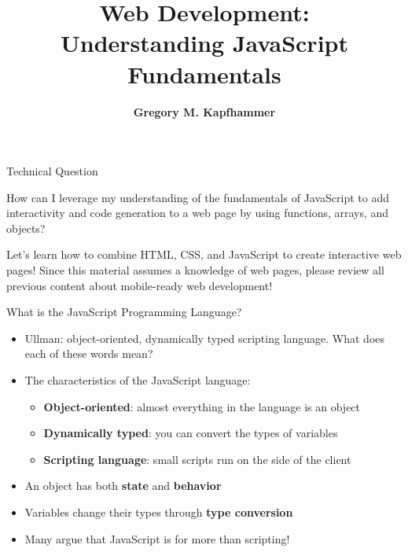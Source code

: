 \documentclass[14pt,aspectratio=169]{beamer}
\title{Web Development: \\ Understanding JavaScript Fundamentals}
\author{{\bf Gregory M. Kapfhammer}}
\institute[shortinst]{{\bf Department of Computer Science, Allegheny College}}
\begin{document}
{
  \begin{frame}
    \titlepage
  \end{frame}
}

%
\begin{frame}{Technical Question}
  \hspace*{.25in}
  \begin{minipage}{4.75in}
    \vspace*{.2in}
    \begin{center}
      {\large How can I leverage my understanding of the fundamentals of
        JavaScript to add interactivity and code generation to a web page by
      using functions, arrays, and objects?}
    \end{center}
  \end{minipage}
  \vspace{3ex}
  \begin{center}
    \small Let's learn how to combine HTML, CSS, and JavaScript to create
    interactive web pages! Since this material assumes a knowledge of web
    pages, please review all previous content about mobile-ready web
    development! \\
  \end{center}
\end{frame}

%
\begin{frame}{What is the JavaScript Programming Language?}
  \begin{itemize}
    \item Ullman: object-oriented, dynamically typed scripting language. What
      does each of these words mean?
      \vspace*{-.15in}
    \item The characteristics of the JavaScript language:
      \begin{itemize}
        \item {\bf Object-oriented}: almost everything in the language is an
          object
        \item {\bf Dynamically typed}: you can convert the types of variables
        \item {\bf Scripting language}: small scripts run on the side of the client
      \end{itemize}
      \vspace*{-.2in}
    \item An object has both {\bf state} and {\bf behavior}
      \vspace*{-.2in}
    \item Variables change their types through {\bf type conversion}
      \vspace*{-.2in}
    \item Many argue that JavaScript is for more than scripting!
  \end{itemize}
\end{frame}
\end{document}
